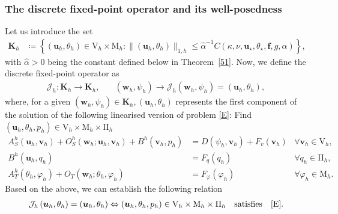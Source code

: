 \documentclass[10pt,a4paper]{article}
\begin{document}
\subsubsection{The discrete fixed-point operator and its well-posedness}
  Let us introduce the set
  		\begin{align}\label{qa5}
  		\boldsymbol{K}_h &\coloneqq\left\{(\boldsymbol{u}_h, \theta_h) \in \mathrm{V}_h \times \mathrm{M}_h :\|(\boldsymbol{u}_h, \theta_h)\|_{1,h} \leq {\hat{\alpha}}^{-1}C(\kappa, \nu, \boldsymbol{u}_{\star}, \theta_{\star}, \boldsymbol{f}, g, \alpha) \right\}, 
  		\end{align}
  		with $\hat{\alpha}>0$ being the constant defined below in Theorem~\ref{51}. Now, we define the discrete fixed-point operator as
  		\begin{align*}
        \mathcal{J}_h: \boldsymbol{K}_h \rightarrow \boldsymbol{K}_h, &\quad (\boldsymbol{w}_h,\psi_h) \rightarrow \mathcal{J}_h\left(\boldsymbol{w}_h, \psi_h\right)=(\boldsymbol{u}_h, \theta_h),
  		\end{align*} 
  		where, for a given $(\boldsymbol{w}_h,\psi_h) \in \boldsymbol{K}_h, 
     (\boldsymbol{u}_h, \theta_h)$ represents the first component of the solution of the following linearised version of problem \eqref{E}: Find $\left( \boldsymbol{u}_h, \theta_h, p_h \right) \in \mathrm{V}_h \times \mathrm{M}_h \times  \mathrm{\Pi}_h $ 
  		\begin{equation}\label{43}
  		\begin{array}{rlrl}
        {A}_S^h(\boldsymbol{u}_h, \boldsymbol{v}_h) + {O}_S^h(\boldsymbol{w}_h ; \boldsymbol{u}_h, \boldsymbol{v}_h) + {B}^h(\boldsymbol{v}_h,p_h) & = D(\psi_h,\boldsymbol{v}_h)+F_v(\boldsymbol{v}_h) & \forall \boldsymbol{v}_h \in \mathrm{V}_h, \\
  	    {B}^h(\boldsymbol{u}_h, q_h) & = F_q(q_h) & \forall q_h \in \mathrm{\Pi}_h, \\ 
       {A}^h_T(\theta_h,\varphi_h) + O_T(\boldsymbol{w}_h; \theta_h, \varphi_h) & = F_{\varphi}(\varphi_h) & \forall \varphi_h \in \mathrm{M}_{h}.
  		\end{array}
  		\end{equation}
  		Based on the above, we can establish the following relation
    \begin{align}\label{44}
  		\mathcal{J}_h\left(\boldsymbol{u}_h, \theta_h\right)=(\boldsymbol{u}_h,\theta_h) \Leftrightarrow\left( \boldsymbol{u}_h,\theta_h,p_h\right) \in \mathrm{V}_h \times \mathrm{M}_h \times  \mathrm{\Pi}_h 
  \quad\text{satisfies} \ \ \ \eqref{E}.
\end{align}
  		
\end{document}
